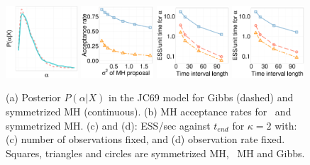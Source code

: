   \begin{figure}%
  \centering
  \begin{minipage}[!hp]{0.99\linewidth}
  \centering
    \includegraphics [width=0.24\textwidth, angle=0]{figs/JC_ks/jc_hist_44_05_3_.pdf}
    \includegraphics [width=0.24\textwidth, angle=0]{figs/acc/JCalpha_k2.pdf}
    \includegraphics [width=0.24\textwidth, angle=0]{figs/new_experiment_figs/ESS_vs_t_alpha_JC.pdf}
    \includegraphics [width=0.24\textwidth, angle=0]{figs/new_experiment_figs/ESS_vs_t_alpha_fixobservation_JC.pdf}
  \end{minipage}

  \caption{(a) Posterior $P(\alpha|X)$ in the JC69 model for Gibbs (dashed) and symmetrized MH (continuous). (b) MH acceptance rates for \naive\  and symmetrized MH. (c) and (d):
  ESS/sec against $t_{end}$ for $\kappa=2$ with: (c) number of observations fixed, and (d) observation rate fixed. {Squares, triangles and circles} are symmetrized MH, \naive\ MH and Gibbs. }
	\label{fig:jc_model_vs_t}
  \end{figure}
